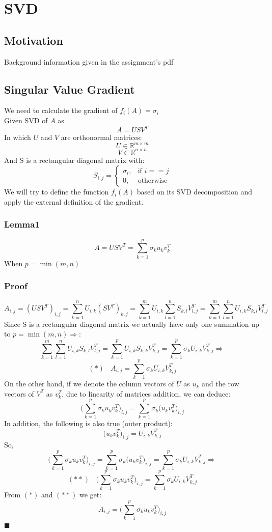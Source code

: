 \documentclass[12pt]{article}
\newcommand{\qed}{\hfill$\blacksquare$}
\begin{document}
\newpage
\section{SVD}
\subsection{Motivation}
Background information given in the assignment's pdf
\subsection{Singular Value Gradient}
We need to calculate the gradient of $f_i(A) = \sigma_i$\\
Given SVD of $A$ as $$A=USV^T$$
In which $U$ and $V$ are orthonormal matrices:
$$U \in \mathbb{R}^{m\times m}$$
$$V \in \mathbb{R}^{n\times n}$$
And S is a rectangular diagonal matrix with:
\[
    S_{i,j}= 
\begin{cases}
    \sigma_i,& \text{if } i==j\\
    0,       & \text{otherwise}
\end{cases}
\]
We will try to define the function $f_i(A)$ based on its SVD decomposition and apply the external definition of the gradient.\\
\subsubsection*{Lemma1}
$$A=USV^T=\sum_{k=1}^p\sigma_k u_{k} v^T_{k}$$ When $p=\min(m,n)$
\subsubsection*{Proof}
$$A_{i,j}=(USV^T)_{i,j}=\sum_{k=1}^n U_{i,k} (SV^T)_{k,j}=\sum_{k=1}^m U_{i,k} \sum_{l=1}^n S_{k,l}V^T_{l,j}=\sum_{k=1}^m \sum_{l=1}^n U_{i,k}  S_{k,l}V^T_{l,j}$$
Since S is a rectangular diagonal matrix we actually have only one summation up to $p=\min(m,n) \Rightarrow$:
$$\sum_{k=1}^m \sum_{l=1}^n U_{i,k}  S_{k,l}V^T_{l,j}=\sum_{k=1}^p U_{i,k}  S_{k,k}V^T_{k,j} =\sum_{k=1}^p\sigma_k U_{i,k}V^T_{k,j} \Rightarrow$$
$$(*)\:\:\:\:A_{i,j}=\sum_{k=1}^p\sigma_k U_{i,k}V^T_{k,j}$$
On the other hand, if we denote the column vectors of $U$ as $u_k$ and the row vectors of $V^T$ as $v^T_k$,
due to linearity of matrices addition, we can deduce:
$$\Big(\sum_{k=1}^p\sigma_k u_{k} v^T_{k}\Big)_{i,j}=\sum_{k=1}^p\sigma_k \Big(u_{k} v^T_{k}\Big)_{i,j}$$
In addition, the following is also true (outer product):
$$\Big(u_{k} v^T_{k}\Big)_{i,j}=U_{i,k}V^T_{k,j}$$
So,
$$\Big(\sum_{k=1}^p\sigma_k u_{k} v^T_{k}\Big)_{i,j}=\sum_{k=1}^p\sigma_k \Big(u_{k} v^T_{k}\Big)_{i,j}=\sum_{k=1}^p\sigma_k U_{i,k}V^T_{k,j}\Rightarrow$$
$$(**)\:\:\:\:\Big(\sum_{k=1}^p\sigma_k u_{k} v^T_{k}\Big)_{i,j}=\sum_{k=1}^p\sigma_k U_{i,k}V^T_{k,j}$$
From $(*)$ and $(**)$ we get:
$$A_{i,j}=\Big(\sum_{k=1}^p\sigma_k u_{k} v^T_{k}\Big)_{i,j}$$
\qed\\
\end{document}
